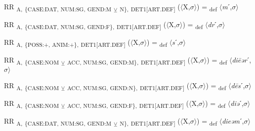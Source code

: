 {\begin{exe}
 RR \textsubscript{A,} \textsubscript{\{CASE:DAT, NUM:SG, GEND:M} \textsubscript{${\veebar}$}\textsubscript{ N\},} \textsubscript{DET1[ART.DEF]} ($\langle$X,$\sigma $$\rangle$) = \textsubscript{def} $\langle$\textit{m}ˊ,$\sigma $$\rangle$
\end{exe}

\begin{exe}
 RR \textsubscript{A,} \textsubscript{\{CASE:DAT, NUM:SG, GEND:F\},} \textsubscript{DET1[ART.DEF]} ($\langle$X,$\sigma $$\rangle$) = \textsubscript{def} $\langle$\textit{dr}ˊ,$\sigma $$\rangle$
\end{exe}

\begin{exe}
 RR \textsubscript{A,} \textsubscript{\{POSS:+, ANIM:+\},} \textsubscript{DET1[ART.DEF]} ($\langle$X,$\sigma $$\rangle$) = \textsubscript{def} $\langle$\textit{s}ˊ,$\sigma $$\rangle$
\end{exe}

\begin{exe}
 RR \textsubscript{A,} \textsubscript{\{CASE:NOM} \textsubscript{${\veebar}$}\textsubscript{ ACC, NUM:SG, GEND:M\},} \textsubscript{DET1[ART.DEF]} ($\langle$X,$\sigma $$\rangle$) = \textsubscript{def} $\langle$\textit{di\=eər}ˊ,$\sigma $$\rangle$
\end{exe}

\begin{exe}
 RR \textsubscript{A,} \textsubscript{\{CASE:NOM} \textsubscript{${\veebar}$}\textsubscript{ ACC, NUM:SG, GEND:N\},} \textsubscript{DET1[ART.DEF]} ($\langle$X,$\sigma $$\rangle$) = \textsubscript{def} $\langle$\textit{d\=es}ˊ,$\sigma $$\rangle$
\end{exe}

\begin{exe}
 RR \textsubscript{A,} \textsubscript{\{CASE:NOM} \textsubscript{${\veebar}$}\textsubscript{ ACC, NUM:SG, GEND:F\},} \textsubscript{DET1[ART.DEF]} ($\langle$X,$\sigma $$\rangle$) = \textsubscript{def} $\langle$\textit{diə}ˊ,$\sigma $$\rangle$
\end{exe}

\begin{exe}
 RR \textsubscript{A,} \textsubscript{\{CASE:DAT, NUM:SG, GEND:M} \textsubscript{${\veebar}$}\textsubscript{ N\},} \textsubscript{DET1[ART.DEF]} ($\langle$X,$\sigma $$\rangle$) = \textsubscript{def} $\langle$\textit{dieəm}ˊ,$\sigma $$\rangle$
\end{exe}

}
